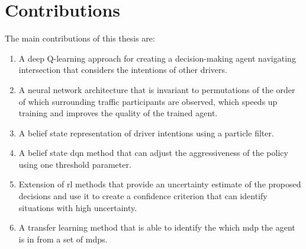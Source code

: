 \section{Contributions}
\label{sec:contributions}
The main contributions of this thesis are:
\begin{enumerate}
	\item A deep Q-learning approach for creating a decision-making agent navigating intersection that considers the intentions of other drivers. 
	\item A neural network architecture that is invariant to permutations of the order of which surrounding traffic participants are observed, which speeds up training and improves the quality of the trained agent. 
	\item A belief state representation of driver intentions using a particle filter.
	\item A belief state \gls{dqn} method that can adjust the aggressiveness of the policy using one threshold parameter.
	\item Extension of \gls{rl} methods that provide an uncertainty estimate of the proposed decisions and use it to create a confidence criterion that can identify situations with high uncertainty. 
	\item A transfer learning method that is able to identify the which \gls{mdp} the agent is in from a set of \gls{mdp}s.
\end{enumerate}


